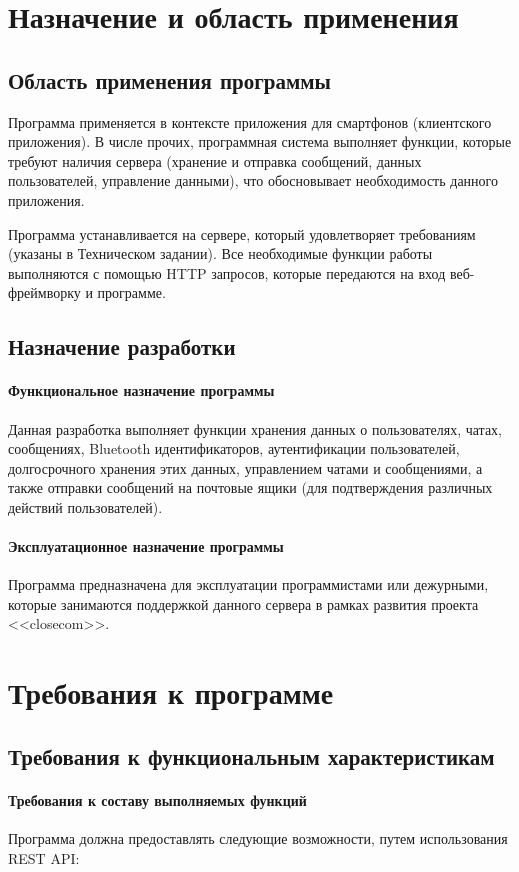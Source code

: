 \documentclass[explnote]{espd}
\begin{document}
\section{Назначение и область применения}
\subsection{Область применения программы}
Программа применяется в контексте приложения для смартфонов (клиентского приложения). В числе прочих, программная система выполняет функции, которые требуют наличия сервера (хранение и отправка сообщений, данных пользователей, управление данными), что обосновывает необходимость данного приложения.

Программа устанавливается на сервере, который удовлетворяет требованиям (указаны в Техническом задании). Все необходимые функции работы выполняются с помощью HTTP запросов, которые передаются на вход веб-фреймворку и программе.

\subsection{Назначение разработки}
\paragraph{Функциональное назначение программы}
Данная разработка выполняет функции хранения данных о пользователях, чатах, сообщениях, Bluetooth идентификаторов, аутентификации пользователей, долгосрочного хранения этих данных, управлением чатами и сообщениями, а также отправки сообщений на почтовые ящики (для подтверждения различных действий пользователей).

\paragraph{Эксплуатационное назначение программы}
Программа предназначена для эксплуатации программистами или дежурными, которые занимаются поддержкой данного сервера в рамках развития проекта <<closecom>>.

\section{Требования к программе}
\subsection{Требования к функциональным характеристикам}
\paragraph{Требования к составу выполняемых функций}
Программа должна предоставлять следующие возможности, путем использования REST API:
\end{document}
